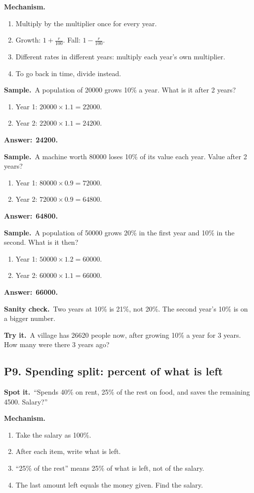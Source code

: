 \documentclass[11pt,a4paper]{article}
\let\oldsubsection\subsection
\renewcommand{\subsection}{\needspace{9\baselineskip}\oldsubsection}
\newcommand{\spot}{\textbf{\color{ember}Spot it.}\ }
\newcommand{\mech}{\textbf{\color{ember}Mechanism.}\ }
\newif\ifkeepsamp
\newcommand{\ans}[1]{\par\nopagebreak\noindent\textbf{\color{ember}Answer:}\ \textbf{#1}\par}
\newcommand{\samp}{\ifkeepsamp\needspace{4\baselineskip}\fi\textbf{\color{ember}Sample.}\ }
\newcommand{\sane}{\textbf{\color{slate}Sanity check.}\ }
\newcommand{\tryit}[1]{\textbf{\color{ember}Try it.}\ #1}
\begin{document}
\mech
\begin{enumerate}
\item Multiply by the multiplier once for every year.
\item Growth: $1 + \tfrac{r}{100}$. Fall: $1 - \tfrac{r}{100}$.
\item Different rates in different years: multiply each year's own multiplier.
\item To go back in time, divide instead.
\end{enumerate}

\samp A population of 20000 grows 10\% a year. What is it after 2 years?
\begin{enumerate}
\item Year 1: $20000 \times 1.1 = 22000$.
\item Year 2: $22000 \times 1.1 = 24200$.
\end{enumerate}
\ans{24200.}

\samp A machine worth 80000 loses 10\% of its value each year. Value after 2 years?
\begin{enumerate}
\item Year 1: $80000 \times 0.9 = 72000$.
\item Year 2: $72000 \times 0.9 = 64800$.
\end{enumerate}
\ans{64800.}

\samp A population of 50000 grows 20\% in the first year and 10\% in the second. What is it then?
\begin{enumerate}
\item Year 1: $50000 \times 1.2 = 60000$.
\item Year 2: $60000 \times 1.1 = 66000$.
\end{enumerate}
\ans{66000.}

\sane Two years at 10\% is 21\%, not 20\%. The second year's 10\% is on a bigger number.

\tryit A village has 26620 people now, after growing 10\% a year for 3 years. How many were there 3 years ago?

\subsection{P9. Spending split: percent of what is left}
\spot ``Spends 40\% on rent, 25\% of the rest on food, and saves the remaining 4500. Salary?''

\mech
\begin{enumerate}
\item Take the salary as 100\%.
\item After each item, write what is left.
\item ``25\% of the rest'' means 25\% of what is left, not of the salary.
\item The last amount left equals the money given. Find the salary.
\end{enumerate}
\end{document}
